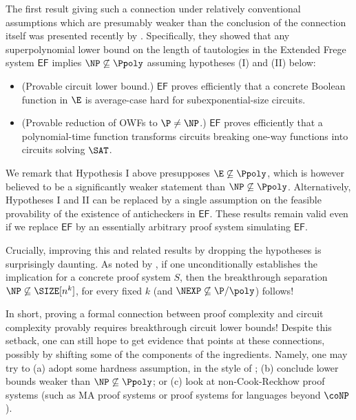 \documentclass[11pt]{article}
\newcommand{\EF}{\mathsf{EF}}
\theoremstyle{definition}
\theoremstyle{plain}
\theoremstyle{remark}
\begin{document}
The first result giving such a connection under relatively conventional assumptions which are presumably weaker than the conclusion of the connection itself was presented recently by \citeauthor{Pseopt} \cite{Pseopt}. Specifically, they showed that any superpolynomial lower bound on the length of tautologies in the Extended Frege system $\EF$ implies $\NP\not\subseteq\Ppoly$ assuming hypotheses (I) and (II) below:

\begin{itemize}
\item[\textsc{I}.] (Provable circuit lower bound.) $\EF$ proves efficiently that a concrete Boolean function in $\E$ is average-case hard for subexponential-size circuits.

\item[\textsc{II}.] (Provable reduction of OWFs to $\P\neq\NP$.) $\EF$ proves efficiently that a polynomial-time function transforms circuits breaking one-way functions into circuits solving $\SAT$.
\end{itemize}

We remark that Hypothesis I above presupposes $\E\not\subseteq\Ppoly$, which is however believed to be a significantly weaker statement than $\NP\not\subseteq\Ppoly$. Alternatively, Hypotheses I and II can be replaced by a single assumption on the feasible provability of the existence of anticheckers in $\EF$. These results remain valid even if we replace $\EF$ by an essentially arbitrary proof system simulating $\EF$.

Crucially, improving this and related results by dropping the hypotheses is surprisingly daunting. As noted by \citeauthor{Pseopt} \cite[Prop. 1]{Pseopt}, if one unconditionally establishes the implication  for a concrete proof system $S$, then the breakthrough separation $\NP \not\subseteq \SIZE[n^k]$, for every fixed $k$ (and $\NEXP\not\subseteq\P/\poly$) follows!

In short, proving a formal connection between proof complexity and circuit complexity provably requires breakthrough circuit lower bounds! Despite this setback, one can still hope to get evidence that points at these connections, possibly by shifting some of the components of the ingredients. Namely, one may try to (a) adopt some hardness assumption, in the style of \cite{Pseopt}; (b) conclude lower bounds weaker than $\NP \not\subseteq \Ppoly$; or (c) look at non-Cook-Reckhow proof systems (such as MA proof systems or proof systems for languages beyond $\coNP$).
\end{document}
